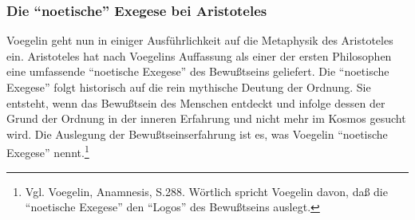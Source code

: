 \subsubsection{Die "`noetische"' Exegese bei Aristoteles} 

Voegelin geht nun in einiger Ausführlichkeit auf die Metaphysik des
Aristoteles ein. Aristoteles hat nach Voegelins Auffassung als einer der
ersten Philosophen eine umfassende "`noetische Exegese"' des Bewußtseins
geliefert. Die "`noetische Exegese"' folgt historisch auf die rein mythische
Deutung der Ordnung. Sie entsteht, wenn das Bewußtsein des Menschen entdeckt
und infolge dessen der Grund der Ordnung in der inneren Erfahrung und nicht
mehr im Kosmos gesucht wird. Die Auslegung der Bewußtseinserfahrung ist es,
was Voegelin "`noetische Exegese"' nennt.\footnote{Vgl. Voegelin, Anamnesis,
  S.288.  Wörtlich spricht Voegelin davon, daß die "`noetische Exegese"' den
  "`Logos"' des Bewußtseins auslegt.}
 
